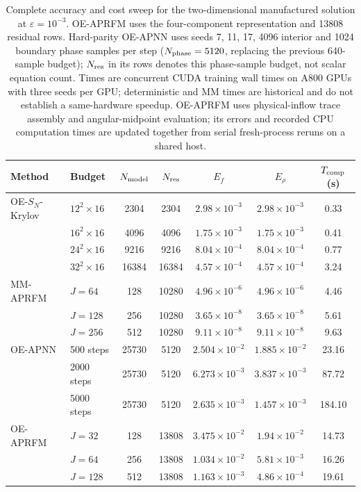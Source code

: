 \begin{table}[!htb]
\centering\small
\setlength{\tabcolsep}{2.8pt}
\caption{Complete accuracy and cost sweep for the two-dimensional manufactured solution at $\varepsilon=10^{-3}$. OE-APRFM uses the four-component representation and 13808 residual rows. Hard-parity OE-APNN uses seeds 7, 11, 17, 4096 interior and 1024 boundary phase samples per step ($N_{\rm phase}=5120$, replacing the previous 640-sample budget); $N_{\rm res}$ in its rows denotes this phase-sample budget, not scalar equation count. Times are concurrent CUDA training wall times on A800 GPUs with three seeds per GPU; deterministic and MM times are historical and do not establish a same-hardware speedup. OE-APRFM uses physical-inflow trace assembly and angular-midpoint evaluation; its errors and recorded CPU computation times are updated together from serial fresh-process reruns on a shared host.}
\label{tab:supp-efficiency-2d}
\begin{tabular}{llccccc}
\toprule
Method & Budget & $N_{\rm model}$ & $N_{\rm res}$ & $E_f$ & $E_\rho$ & $T_{\rm comp}$ (s)\\
\midrule
OE-$S_N$-Krylov & $12^2\times16$ & 2304 & 2304 & $2.98\times10^{-3}$ & $2.98\times10^{-3}$ & 0.33\\
 & $16^2\times16$ & 4096 & 4096 & $1.75\times10^{-3}$ & $1.75\times10^{-3}$ & 0.41\\
 & $24^2\times16$ & 9216 & 9216 & $8.04\times10^{-4}$ & $8.04\times10^{-4}$ & 0.77\\
 & $32^2\times16$ & 16384 & 16384 & $4.57\times10^{-4}$ & $4.57\times10^{-4}$ & 3.24\\
\addlinespace
MM-APRFM & $J=64$ & 128 & 10280 & $4.96\times10^{-6}$ & $4.96\times10^{-6}$ & 4.46\\
 & $J=128$ & 256 & 10280 & $3.65\times10^{-8}$ & $3.65\times10^{-8}$ & 5.61\\
 & $J=256$ & 512 & 10280 & $9.11\times10^{-8}$ & $9.11\times10^{-8}$ & 9.63\\
\addlinespace
OE-APNN & 500 steps & 25730 & 5120 & $2.504\times10^{-2}$ & $1.885\times10^{-2}$ & 23.16\\
  & 2000 steps & 25730 & 5120 & $6.273\times10^{-3}$ & $3.837\times10^{-3}$ & 87.72\\
  & 5000 steps & 25730 & 5120 & $2.635\times10^{-3}$ & $1.457\times10^{-3}$ & 184.10\\
\addlinespace
OE-APRFM & $J=32$ & 128 & 13808 & $3.475\times10^{-2}$ & $1.94\times10^{-2}$ & 14.73\\
 & $J=64$ & 256 & 13808 & $1.034\times10^{-2}$ & $5.81\times10^{-3}$ & 16.26\\
 & $J=128$ & 512 & 13808 & $1.163\times10^{-3}$ & $4.86\times10^{-4}$ & 19.61\\
\bottomrule
\end{tabular}
\end{table}

